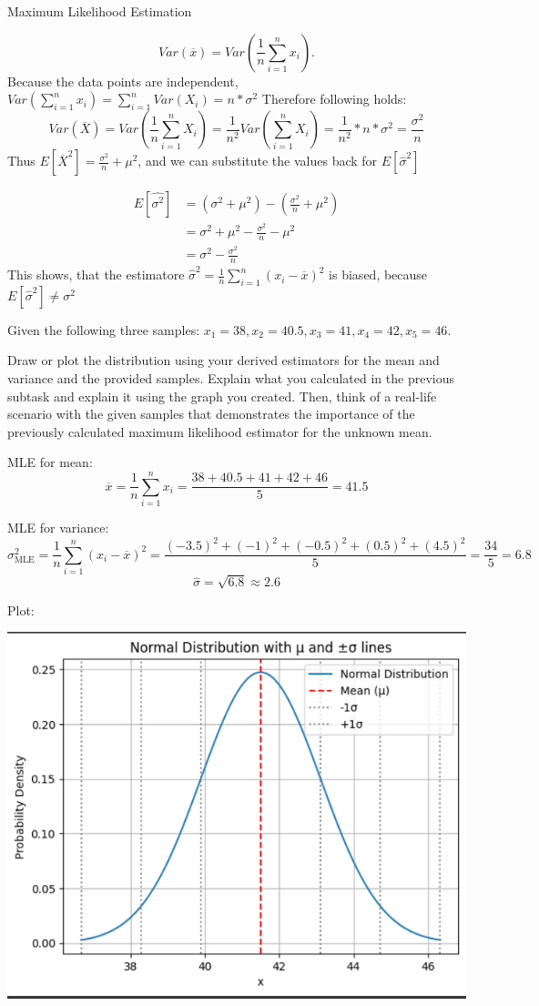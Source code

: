 \documentclass[
	english,
        solution=true
	]{tudaexercise}
\begin{document}
\begin{task}[points=20]{Maximum Likelihood Estimation}
\begin{solution}
\[Var(\overline{x})=Var(\frac{1}{n} \sum^n_{i=1} x_i).\]
Because the data points are independent, $Var(\sum^n_{i=1} x_i)=\sum^n_{i=1} Var(X_i)=n*\sigma^2$
Therefore following holds:
\[Var(\overline{X})=Var(\frac{1}{n} \sum^n_{i=1} X_i)= \frac{1}{n^2} Var(\sum^n_{i=1} X_i)=\frac{1}{n^2}*n*\sigma^2=\frac{\sigma^2}{n}\]
Thus $E[\overline{X}^2]=\frac{\sigma
^2}{n}+\mu^2$, and we can substitute the values back for $E[\hat{\sigma}^2]$

\begin{align*}
    E[\hat{\sigma^2}]&=(\sigma^2 + \mu^2)-(\frac{\sigma^2}{n}+\mu^2)\\
    &= \sigma^2 + \mu^2 - \frac{\sigma^2}{n}-\mu^2 \\
    &=\sigma^2-\frac{\sigma^2}{n}
\end{align*}
This shows, that the estimatore $\hat{\sigma}^2=\frac{1}{n} \sum^n_{i=1}(x_i - \overline{x})^2$ is biased, because $E[\hat{\sigma}^2] \ne \sigma^2$
\end{solution}

\begin{subtask}[points=5]
Given the following three samples:
$x_1 = 38, x_2 = 40.5, x_3 = 41, x_4 = 42, x_5 = 46$.

Draw or plot the distribution using your derived estimators for the mean and variance and the provided samples. Explain what you calculated in the previous subtask and explain it using the graph you created. Then, think of a real-life scenario with the given samples that demonstrates the importance of the previously calculated maximum likelihood estimator for the unknown mean.

\begin{solution}

MLE for mean: 
\[\overline{x}=\frac{1}{n} \sum^n_{i=1} x_i = \frac{38+40.5+41+42+46}{5}=41.5\]

MLE for variance:
\[\sigma^2_{\text{MLE}} = \frac{1}{n} \sum^n_{i=1} (x_i-\overline{x})^2=\frac{(-3.5)^2+(-1)^2+(-0.5)^2+(0.5)^2+(4.5)^2}{5}=\frac{34}{5}=6.8\]
\[\hat{\sigma}=\sqrt{6.8}\approx 2.6\]

Plot:

\begin{center}
    \includegraphics[width=0.75\linewidth]{normalDistro1d.png}
\end{center}


\end{solution}
\end{subtask}
\end{task}
\end{document}
